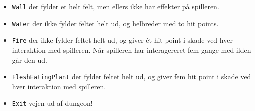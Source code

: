 \begin{itemize}
\item \lstinline{Wall} der fylder et helt felt, men ellers ikke har effekter på
  spilleren.
\item \lstinline{Water} der ikke fylder feltet helt ud, og helbreder med to
  hit points.
\item \lstinline{Fire} der ikke fylder feltet helt ud, og giver ét hit point i
  skade ved hver interaktion med spilleren. Når spilleren har
  interagereret fem gange med ilden går den ud.
\item \lstinline{FleshEatingPlant} der fylder feltet helt ud, og giver fem hit point i
  skade ved hver interaktion med spilleren.
\item \lstinline{Exit} vejen ud af dungeon!
\end{itemize}



